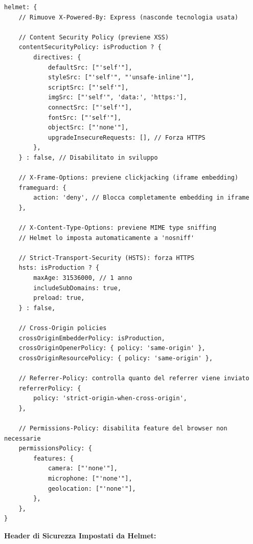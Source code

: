 \documentclass[11pt,a4paper]{article}
\begin{document}
\begin{lstlisting}[caption=Configurazione Helmet Dettagliata]
helmet: {
    // Rimuove X-Powered-By: Express (nasconde tecnologia usata)
    
    // Content Security Policy (previene XSS)
    contentSecurityPolicy: isProduction ? {
        directives: {
            defaultSrc: ["'self'"],
            styleSrc: ["'self'", "'unsafe-inline'"],
            scriptSrc: ["'self'"],
            imgSrc: ["'self'", 'data:', 'https:'],
            connectSrc: ["'self'"],
            fontSrc: ["'self'"],
            objectSrc: ["'none'"],
            upgradeInsecureRequests: [], // Forza HTTPS
        },
    } : false, // Disabilitato in sviluppo
    
    // X-Frame-Options: previene clickjacking (iframe embedding)
    frameguard: {
        action: 'deny', // Blocca completamente embedding in iframe
    },
    
    // X-Content-Type-Options: previene MIME type sniffing
    // Helmet lo imposta automaticamente a 'nosniff'
    
    // Strict-Transport-Security (HSTS): forza HTTPS
    hsts: isProduction ? {
        maxAge: 31536000, // 1 anno
        includeSubDomains: true,
        preload: true,
    } : false,
    
    // Cross-Origin policies
    crossOriginEmbedderPolicy: isProduction,
    crossOriginOpenerPolicy: { policy: 'same-origin' },
    crossOriginResourcePolicy: { policy: 'same-origin' },
    
    // Referrer-Policy: controlla quanto del referrer viene inviato
    referrerPolicy: {
        policy: 'strict-origin-when-cross-origin',
    },
    
    // Permissions-Policy: disabilita feature del browser non necessarie
    permissionsPolicy: {
        features: {
            camera: ["'none'"],
            microphone: ["'none'"],
            geolocation: ["'none'"],
        },
    },
}
\end{lstlisting}

\textbf{Header di Sicurezza Impostati da Helmet:}
\end{document}
